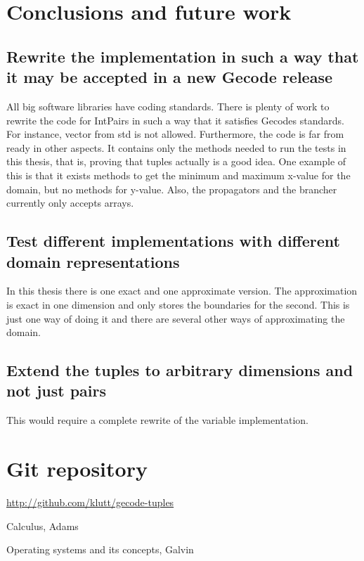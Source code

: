 \documentclass[a4paper,11pt]{article}
\begin{document}
\section{Conclusions and future work}

\subsection{Rewrite the implementation in such a way that it may be accepted in a new Gecode release}
All big software libraries have coding standards. There is plenty of work to rewrite the code for IntPairs in such a way that it satisfies Gecodes standards. For instance, vector from std is not allowed. Furthermore, the code is far from ready in other aspects. It contains only the methods needed to run the tests in this thesis, that is, proving that tuples actually is a good idea. One example of this is that it exists methods to get the minimum and maximum x-value for the domain, but no methods for y-value. Also, the propagators and the brancher currently only accepts arrays.

\subsection{Test different implementations with different domain representations}
In this thesis there is one exact and one approximate version. The approximation is exact in one dimension and only stores the boundaries for the second. This is just one way of doing it and there are several other ways of approximating the domain.

\subsection{Extend the tuples to arbitrary dimensions and not just pairs}
This would require a complete rewrite of the variable implementation.

\section{Git repository}
\url{http://github.com/klutt/gecode-tuples}

\begin{thebibliography}{99}
	Calculus, 
	Adams
	
	Operating systems and its concepts,
	Galvin
\end{thebibliography}
\end{document}
